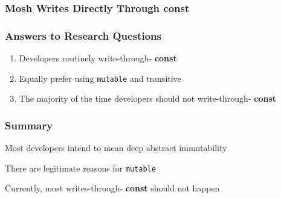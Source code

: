 \documentclass[aspectratio=169]{beamer}
\newcommand{\const}{{\color{blue} \bfseries \ttfamily const}}
\begin{document}
  \begin{frame}
    \frametitle{Mosh Writes Directly Through \const{}}
    \centering
    \large
  \end{frame}

  \begin{frame}
    \frametitle{Answers to Research Questions}
    \Large
    \begin{enumerate}
      \setlength\itemsep{0.5em}
      \item Developers routinely write-through-\const{}
      \item Equally prefer using \texttt{mutable} and transitive
      \item The majority of the time developers should not write-through-\const{}
    \end{enumerate}
  \end{frame}

  \begin{frame}
    \frametitle{Summary}
    \Large
    Most developers intend to mean deep abstract immutability

    \vspace{1em}
    There are legitimate reasons for \texttt{mutable}

    \vspace{1em}
    Currently, most writes-through-\const{} should not happen
  \end{frame}
\end{document}
